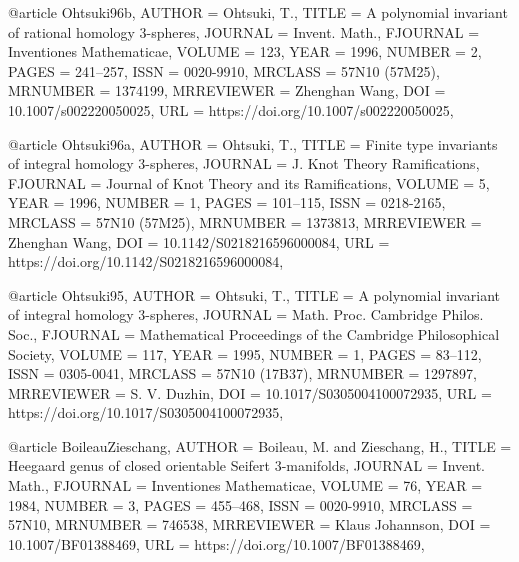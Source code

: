 @article {Ohtsuki96b,
    AUTHOR = {Ohtsuki, T.},
     TITLE = {A polynomial invariant of rational homology {$3$}-spheres},
   JOURNAL = {Invent. Math.},
  FJOURNAL = {Inventiones Mathematicae},
    VOLUME = {123},
      YEAR = {1996},
    NUMBER = {2},
     PAGES = {241--257},
      ISSN = {0020-9910},
   MRCLASS = {57N10 (57M25)},
  MRNUMBER = {1374199},
MRREVIEWER = {Zhenghan Wang},
       DOI = {10.1007/s002220050025},
       URL = {https://doi.org/10.1007/s002220050025},
}

@article {Ohtsuki96a,
    AUTHOR = {Ohtsuki, T.},
     TITLE = {Finite type invariants of integral homology {$3$}-spheres},
   JOURNAL = {J. Knot Theory Ramifications},
  FJOURNAL = {Journal of Knot Theory and its Ramifications},
    VOLUME = {5},
      YEAR = {1996},
    NUMBER = {1},
     PAGES = {101--115},
      ISSN = {0218-2165},
   MRCLASS = {57N10 (57M25)},
  MRNUMBER = {1373813},
MRREVIEWER = {Zhenghan Wang},
       DOI = {10.1142/S0218216596000084},
       URL = {https://doi.org/10.1142/S0218216596000084},
}

@article {Ohtsuki95,
    AUTHOR = {Ohtsuki, T.},
     TITLE = {A polynomial invariant of integral homology {$3$}-spheres},
   JOURNAL = {Math. Proc. Cambridge Philos. Soc.},
  FJOURNAL = {Mathematical Proceedings of the Cambridge Philosophical
              Society},
    VOLUME = {117},
      YEAR = {1995},
    NUMBER = {1},
     PAGES = {83--112},
      ISSN = {0305-0041},
   MRCLASS = {57N10 (17B37)},
  MRNUMBER = {1297897},
MRREVIEWER = {S. V. Duzhin},
       DOI = {10.1017/S0305004100072935},
       URL = {https://doi.org/10.1017/S0305004100072935},
}

@article {BoileauZieschang,
    AUTHOR = {Boileau, M. and Zieschang, H.},
     TITLE = {Heegaard genus of closed orientable {S}eifert {$3$}-manifolds},
   JOURNAL = {Invent. Math.},
  FJOURNAL = {Inventiones Mathematicae},
    VOLUME = {76},
      YEAR = {1984},
    NUMBER = {3},
     PAGES = {455--468},
      ISSN = {0020-9910},
   MRCLASS = {57N10},
  MRNUMBER = {746538},
MRREVIEWER = {Klaus Johannson},
       DOI = {10.1007/BF01388469},
       URL = {https://doi.org/10.1007/BF01388469},
}


